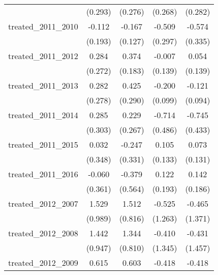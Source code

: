 {\begin{tabular}{l*{4}{c}}
            &     (0.293)         &     (0.276)         &     (0.268)         &     (0.282)         \\
[1em]
treated\_2011\_2010&      -0.112         &      -0.167         &      -0.509         &      -0.574         \\
            &     (0.193)         &     (0.127)         &     (0.297)         &     (0.335)         \\
[1em]
treated\_2011\_2012&       0.284         &       0.374\sym{*}  &      -0.007         &       0.054         \\
            &     (0.272)         &     (0.183)         &     (0.139)         &     (0.139)         \\
[1em]
treated\_2011\_2013&       0.282         &       0.425         &      -0.200\sym{*}  &      -0.121         \\
            &     (0.278)         &     (0.290)         &     (0.099)         &     (0.094)         \\
[1em]
treated\_2011\_2014&       0.285         &       0.229         &      -0.714         &      -0.745         \\
            &     (0.303)         &     (0.267)         &     (0.486)         &     (0.433)         \\
[1em]
treated\_2011\_2015&       0.032         &      -0.247         &       0.105         &       0.073         \\
            &     (0.348)         &     (0.331)         &     (0.133)         &     (0.131)         \\
[1em]
treated\_2011\_2016&      -0.060         &      -0.379         &       0.122         &       0.142         \\
            &     (0.361)         &     (0.564)         &     (0.193)         &     (0.186)         \\
[1em]
treated\_2012\_2007&       1.529         &       1.512         &      -0.525         &      -0.465         \\
            &     (0.989)         &     (0.816)         &     (1.263)         &     (1.371)         \\
[1em]
treated\_2012\_2008&       1.442         &       1.344         &      -0.410         &      -0.431         \\
            &     (0.947)         &     (0.810)         &     (1.345)         &     (1.457)         \\
[1em]
treated\_2012\_2009&       0.615         &       0.603         &      -0.418         &      -0.418         \\

\end{tabular}}
